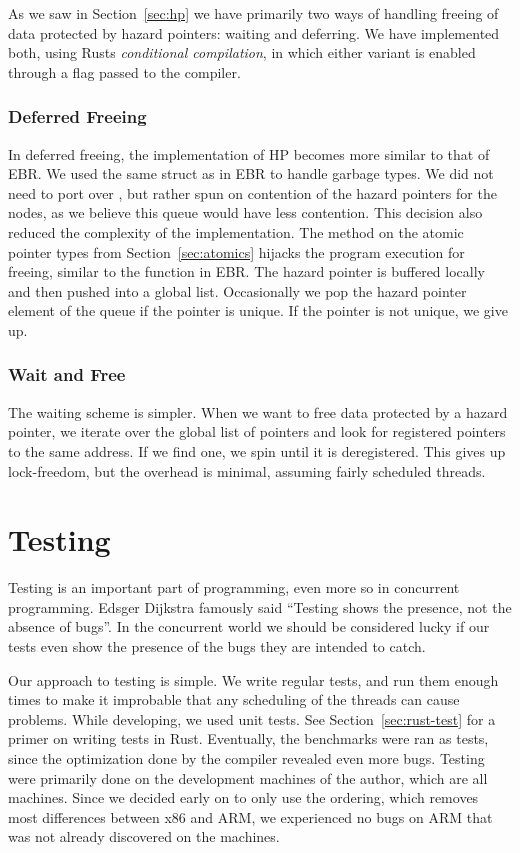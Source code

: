 \documentclass[b5paper]{report}
\begin{document}
As we saw in Section~\ref{sec:hp} we have primarily two ways
of handling freeing of data protected by hazard pointers: waiting and deferring.
We have implemented both, using Rusts \emph{conditional compilation}, in which
either variant is enabled through a flag passed to the compiler.

\subsubsection{Deferred Freeing} In deferred freeing, the implementation of HP
becomes more similar to that of EBR\@. We used the same  struct as
in EBR to handle garbage types. We did not need to port over , but
rather spun on contention of the hazard pointers for the nodes, as we believe
this queue would have less contention. This decision also reduced the complexity
of the implementation. The  method on the atomic pointer types
from Section~\ref{sec:atomics} hijacks the program execution for freeing,
similar to the  function in EBR\@. The hazard pointer is buffered
locally and then pushed into a global list. Occasionally we pop the hazard
pointer element of the queue if the pointer is unique. If the pointer is not
unique, we give up.

\subsubsection{Wait and Free}
The waiting scheme is simpler. When we want to free data protected by a hazard
pointer, we iterate over the global list of pointers and look for registered
pointers to the same address. If we find one, we spin until it is deregistered.
This gives up lock-freedom, but the overhead is minimal, assuming fairly
scheduled threads.


\section{Testing}
Testing is an important part of programming, even more so in concurrent
programming. Edsger Dijkstra famously said ``Testing shows the presence, not the
absence of bugs''\cite{buxton1970software}. In the concurrent world we should be
considered lucky if our tests even show the presence of the bugs they are
intended to catch.

Our approach to testing is simple. We write regular tests, and run them enough
times to make it improbable that any scheduling of the threads can cause
problems. While developing, we used unit tests. See Section~\ref{sec:rust-test}
for a primer on writing tests in Rust. Eventually, the benchmarks were ran as
tests, since the optimization done by the compiler revealed even more bugs.
Testing were primarily done on the development machines of the author, which are
all  machines. Since we decided early on to only use the 
ordering, which removes most differences between x86 and ARM, we experienced no
bugs on ARM that was not already discovered on the  machines.
\end{document}

